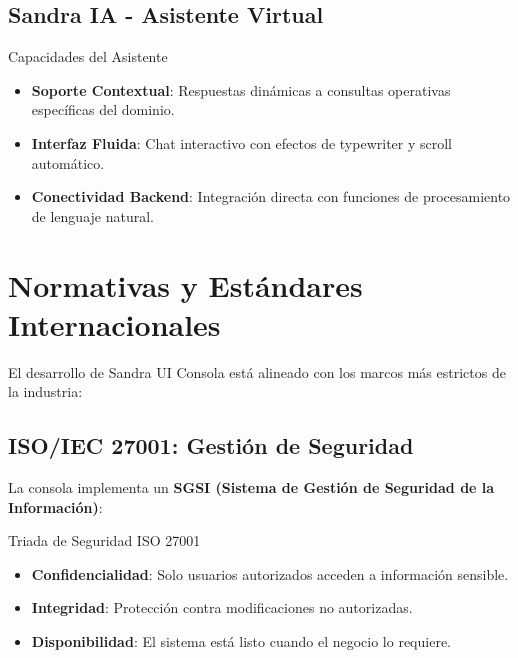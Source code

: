 \subsection{Sandra IA - Asistente Virtual}

\begin{caja}{Capacidades del Asistente}
\begin{itemize}
\item \textbf{Soporte Contextual}: Respuestas dinámicas a consultas operativas específicas del dominio.
\item \textbf{Interfaz Fluida}: Chat interactivo con efectos de typewriter y scroll automático.
\item \textbf{Conectividad Backend}: Integración directa con funciones de procesamiento de lenguaje natural.
\end{itemize}
\end{caja}


\section{Normativas y Estándares Internacionales}

El desarrollo de Sandra UI Consola está alineado con los marcos más estrictos de la industria:

\subsection{ISO/IEC 27001: Gestión de Seguridad}

La consola implementa un \textbf{SGSI (Sistema de Gestión de Seguridad de la Información)}:

\begin{caja}{Triada de Seguridad ISO 27001}
\begin{itemize}
\item \textbf{Confidencialidad}: Solo usuarios autorizados acceden a información sensible.
\item \textbf{Integridad}: Protección contra modificaciones no autorizadas.
\item \textbf{Disponibilidad}: El sistema está listo cuando el negocio lo requiere.
\end{itemize}
\end{caja}


